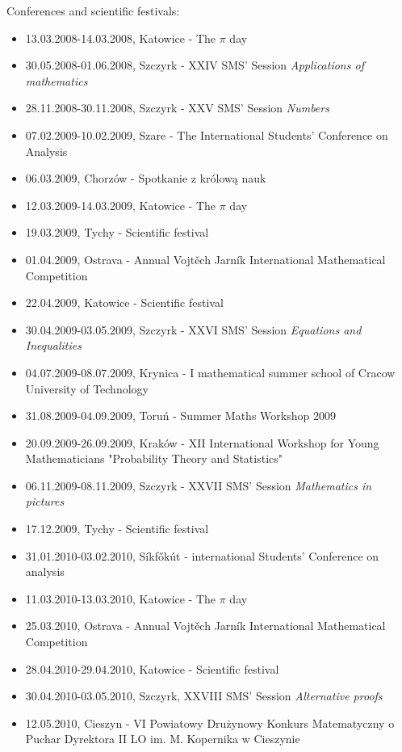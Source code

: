 \noindent Conferences and scientific festivals:
\begin{itemize}
  \item 13.03.2008-14.03.2008, Katowice - The $\pi$ day
  \item 30.05.2008-01.06.2008, Szczyrk - XXIV SMS' Session \textsl{Applications of mathematics}
  \item 28.11.2008-30.11.2008, Szczyrk - XXV SMS' Session \textsl{Numbers}
  \item 07.02.2009-10.02.2009, Szare - The  International Students' Conference on Analysis
  \item 06.03.2009, Chorzów - Spotkanie z królową nauk
  \item 12.03.2009-14.03.2009, Katowice - The $\pi$ day
  \item 19.03.2009, Tychy - Scientific festival
  \item 01.04.2009, Ostrava -  Annual Vojtěch Jarník International Mathematical Competition
  \item 22.04.2009, Katowice - Scientific festival
  \item 30.04.2009-03.05.2009, Szczyrk - XXVI SMS' Session \textsl{Equations and Inequalities}
  \item 04.07.2009-08.07.2009, Krynica - I mathematical summer school of Cracow University of Technology
  \item 31.08.2009-04.09.2009, Toruń - Summer Maths Workshop 2009
  \item 20.09.2009-26.09.2009, Kraków - XII International Workshop for Young Mathematicians "Probability Theory and Statistics"
  \item 06.11.2009-08.11.2009, Szczyrk - XXVII SMS' Session \textsl{Mathematics in pictures}
  \item 17.12.2009, Tychy - Scientific festival
  \item 31.01.2010-03.02.2010, Síkfőkút -  international Students' Conference on analysis
  \item 11.03.2010-13.03.2010, Katowice - The $\pi$ day
  \item 25.03.2010, Ostrava -  Annual Vojtěch Jarník International Mathematical Competition
  \item 28.04.2010-29.04.2010, Katowice - Scientific festival
  \item 30.04.2010-03.05.2010, Szczyrk, XXVIII SMS' Session \textsl{Alternative proofs}
  \item 12.05.2010, Cieszyn - VI Powiatowy Drużynowy Konkurs Matematyczny o Puchar Dyrektora II LO im. M. Kopernika w Cieszynie

\end{itemize}
